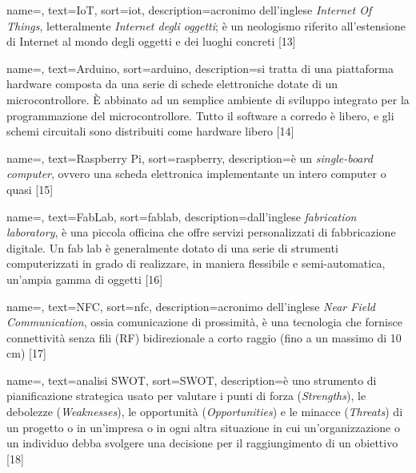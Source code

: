 {
	name=,
    text=IoT,
    sort=iot,
    description={acronimo dell'inglese \textit{Internet Of Things}, letteralmente \textit{Internet degli oggetti}; è un neologismo riferito all'estensione di Internet al mondo degli oggetti e dei luoghi concreti [13]}
}

{
	name=,
    text=Arduino,
    sort=arduino,
    description={si tratta di una piattaforma hardware composta da una serie di schede elettroniche dotate di un microcontrollore. È abbinato ad un semplice ambiente di sviluppo integrato per la programmazione del microcontrollore. Tutto il software a corredo è libero, e gli schemi circuitali sono distribuiti come hardware libero [14]}
}

{
	name=,
    text=Raspberry Pi,
    sort=raspberry,
    description={è un \textit{single-board computer}, ovvero una scheda elettronica implementante un intero computer o quasi [15]}
}

{
	name=,
    text=FabLab,
    sort=fablab,
    description={dall'inglese \textit{fabrication laboratory}, è una piccola officina che offre servizi personalizzati di fabbricazione digitale. Un fab lab è generalmente dotato di una serie di strumenti computerizzati in grado di realizzare, in maniera flessibile e semi-automatica, un'ampia gamma di oggetti [16]}
}

{
	name=,
    text=NFC,
    sort=nfc,
    description={acronimo dell'inglese \textit{Near Field Communication}, ossia comunicazione di prossimità, è una tecnologia che fornisce connettività senza fili (RF) bidirezionale a corto raggio (fino a un massimo di 10 cm) [17]}
}

{
	name=,
    text=analisi SWOT,
    sort=SWOT,
    description={è uno strumento di pianificazione strategica usato per valutare i punti di forza (\textit{Strengths}), le debolezze (\textit{Weaknesses}), le opportunità (\textit{Opportunities}) e le minacce (\textit{Threats}) di un progetto o in un'impresa o in ogni altra situazione in cui un'organizzazione o un individuo debba svolgere una decisione per il raggiungimento di un obiettivo [18]}
}


